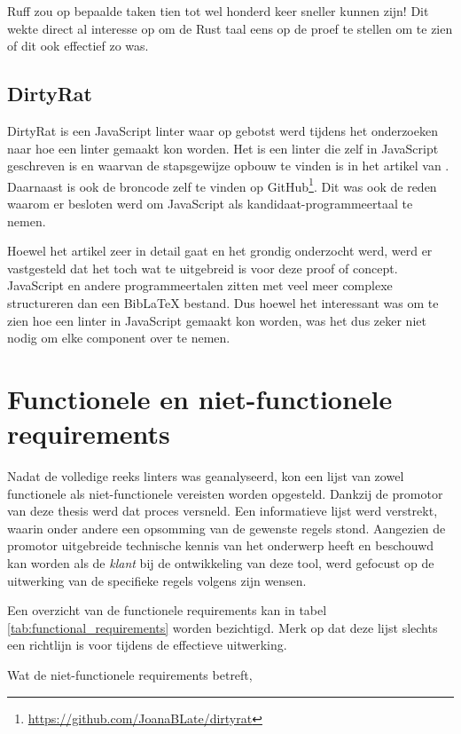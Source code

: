 Ruff zou op bepaalde taken tien tot wel honderd keer sneller kunnen zijn! Dit wekte direct al interesse op om de Rust taal eens op de proef te stellen om te zien of dit ook effectief zo was. 

\subsection{DirtyRat}
\label{subsec:dirtyrat}
DirtyRat is een JavaScript linter waar op gebotst werd tijdens het onderzoeken naar hoe een linter gemaakt kon worden. Het is een linter die zelf in JavaScript geschreven is en waarvan de stapsgewijze opbouw te vinden is in het artikel van \textcite{BorgesLate2021}. Daarnaast is ook de broncode zelf te vinden op GitHub\footnote{\url{https://github.com/JoanaBLate/dirtyrat}}. Dit was ook de reden waarom er besloten werd om JavaScript als kandidaat-programmeertaal te nemen. 

Hoewel het artikel zeer in detail gaat en het grondig onderzocht werd, werd er vastgesteld dat het toch wat te uitgebreid is voor deze proof of concept. JavaScript en andere programmeertalen zitten met veel meer complexe structureren dan een BibLaTeX bestand. Dus hoewel het interessant was om te zien hoe een linter in JavaScript gemaakt kon worden, was het dus zeker niet nodig om elke component over te nemen.

\section{Functionele en niet-functionele requirements}
Nadat de volledige reeks linters was geanalyseerd, kon een lijst van zowel functionele als niet-functionele vereisten worden opgesteld. Dankzij de promotor van deze thesis werd dat proces versneld. Een informatieve lijst werd verstrekt, waarin onder andere een opsomming van de gewenste regels stond. Aangezien de promotor uitgebreide technische kennis van het onderwerp heeft en beschouwd kan worden als de \emph{klant} bij de ontwikkeling van deze tool, werd gefocust op de uitwerking van de specifieke regels volgens zijn wensen.

Een overzicht van de functionele requirements kan in tabel \ref{tab:functional_requirements} worden bezichtigd. Merk op dat deze lijst slechts een richtlijn is voor tijdens de effectieve uitwerking.

Wat de niet-functionele requirements betreft, 

